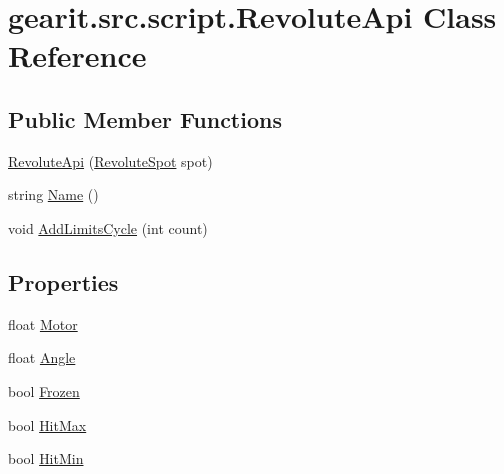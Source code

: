 \hypertarget{classgearit_1_1src_1_1script_1_1_revolute_api}{\section{gearit.\+src.\+script.\+Revolute\+Api Class Reference}
\label{classgearit_1_1src_1_1script_1_1_revolute_api}
}
\subsection*{Public Member Functions}
\begin{DoxyCompactItemize}
\item 
\hyperlink{classgearit_1_1src_1_1script_1_1_revolute_api_adcd3b456405a6cab6158b2162d5c0aac}{Revolute\+Api} (\hyperlink{classgearit_1_1src_1_1robot_1_1_revolute_spot}{Revolute\+Spot} spot)
\item 
string \hyperlink{classgearit_1_1src_1_1script_1_1_revolute_api_a18e1fa24ad6df48c65175e14e23871bc}{Name} ()
\item 
void \hyperlink{classgearit_1_1src_1_1script_1_1_revolute_api_a8d34c3dbf3c01e21f01a989fa56f2052}{Add\+Limits\+Cycle} (int count)
\end{DoxyCompactItemize}
\subsection*{Properties}
\begin{DoxyCompactItemize}
\item 
float \hyperlink{classgearit_1_1src_1_1script_1_1_revolute_api_acadc886eeba92ddc71cb7fd7b3e369a7}{Motor}
\item 
float \hyperlink{classgearit_1_1src_1_1script_1_1_revolute_api_acdc1436533dd16463c12235b0a275b5f}{Angle}
\item 
bool \hyperlink{classgearit_1_1src_1_1script_1_1_revolute_api_a3d513d3ac676016c3de5f485c4a82909}{Frozen}
\item 
bool \hyperlink{classgearit_1_1src_1_1script_1_1_revolute_api_a946f46c98a6072a19949157ced31bbc5}{Hit\+Max}
\item 
bool \hyperlink{classgearit_1_1src_1_1script_1_1_revolute_api_acb481878f7eb43cb5364fb989b978d5c}{Hit\+Min}
\end{DoxyCompactItemize}


